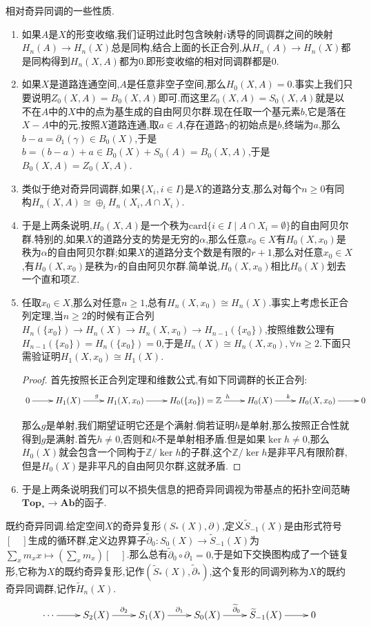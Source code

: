 相对奇异同调的一些性质.
\begin{enumerate}
	\item 如果$A$是$X$的形变收缩,我们证明过此时包含映射$i$诱导的同调群之间的映射$H_n(A)\to H_n(X)$总是同构,结合上面的长正合列,从$H_n(A)\to H_n(X)$都是同构得到$H_n(X,A)$都为0.即形变收缩的相对同调群都是0.
	\item 如果$X$是道路连通空间,$A$是任意非空子空间,那么$H_0(X,A)=0$.事实上我们只要说明$Z_0(X,A)=B_0(X,A)$即可.而这里$Z_0(X,A)=S_0(X,A)$就是以不在$A$中的$X$中的点为基生成的自由阿贝尔群.现在任取一个基元素$b$,它是落在$X-A$中的元,按照$X$道路连通,取$a\in A$,存在道路$\gamma$的初始点是$b$,终端为$a$,那么$b-a=\partial_1(\gamma)\in B_0(X)$,于是$b=(b-a)+a\in B_0(X)+S_0(A)=B_0(X,A)$,于是$B_0(X,A)=Z_0(X,A)$.
	\item 类似于绝对奇异同调群,如果$\{X_i,i\in I\}$是$X$的道路分支,那么对每个$n\ge0$有同构$H_n(X,A)\cong\oplus_iH_n(X_i,A\cap X_i)$.
	\item 于是上两条说明,$H_0(X,A)$是一个秩为$\mathrm{card}\{i\in I\mid A\cap X_i=\emptyset\}$的自由阿贝尔群.特别的,如果$X$的道路分支的势是无穷的$\alpha$,那么任意$x_0\in X$有$H_0(X,x_0)$是秩为$\alpha$的自由阿贝尔群;如果$X$的道路分支个数是有限的$r+1$,那么对任意$x_0\in X$,有$H_0(X,x_0)$是秩为$r$的自由阿贝尔群.简单说,$H_0(X,x_0)$相比$H_0(X)$划去一个直和项$\mathbb{Z}$.
	\item 任取$x_0\in X$,那么对任意$n\ge1$,总有$H_n(X,x_0)\cong H_n(X)$.事实上考虑长正合列定理,当$n\ge2$的时候有正合列$H_n(\{x_0\})\to H_n(X)\to H_n(X,x_0)\to H_{n-1}(\{x_0\})$,按照维数公理有$H_{n-1}(\{x_0\})=H_n(\{x_0\})=0$,于是$H_n(X)\cong H_n(X,x_0),\forall n\ge2$.下面只需验证明$H_1(X,x_0)\cong H_1(X)$.
	\begin{proof}
		
		首先按照长正合列定理和维数公式,有如下同调群的长正合列:
		$$\xymatrix{0\ar[r]&H_1(X)\ar[r]^g&H_1(X,x_0)\ar[r]&H_0(\{x_0\})=\mathbb{Z}\ar[r]^h&H_0(X)\ar[r]^k&H_0(X,x_0)\ar[r]&0}$$
		
		那么$g$是单射,我们期望证明它还是个满射.倘若证明$h$是单射,那么按照正合性就得到$g$是满射.首先$h\not=0$,否则和$k$不是单射相矛盾.但是如果$\ker h\not=0$,那么$H_0(X)$就会包含一个同构于$\mathbb{Z}/\ker h$的子群,这个$\mathbb{Z}/\ker h$是非平凡有限阶群,但是$H_0(X)$是非平凡的自由阿贝尔群,这就矛盾.
	\end{proof}
    \item 于是上两条说明我们可以不损失信息的把奇异同调视为带基点的拓扑空间范畴$\textbf{Top}_*\to\textbf{Ab}$的函子.
\end{enumerate}

既约奇异同调.给定空间$X$的奇异复形$(S_*(X),\partial)$,定义$\widetilde{S}_{-1}(X)$是由形式符号$[\quad]$生成的循环群,定义边界算子$\widetilde{\partial}_0:S_0(X)\to\widetilde{S}_{-1}(X)$为$\sum_xm_xx\mapsto(\sum_xm_x)[\quad]$.那么总有$\widetilde{\partial}_0\circ\partial_1=0$,于是如下交换图构成了一个链复形,它称为$X$的既约奇异复形,记作$(\widetilde{S}_*(X),\widetilde{\partial}_*)$,这个复形的同调列称为$X$的既约奇异同调群,记作$\widetilde{H}_n(X)$.
$$\xymatrix{\cdots\ar[r]&S_2(X)\ar[r]^{\partial_2}&S_1(X)\ar[r]^{\partial_1}&S_0(X)\ar[r]^{\widetilde{\partial}_0}&\widetilde{S}_{-1}(X)\ar[r]&0}$$

